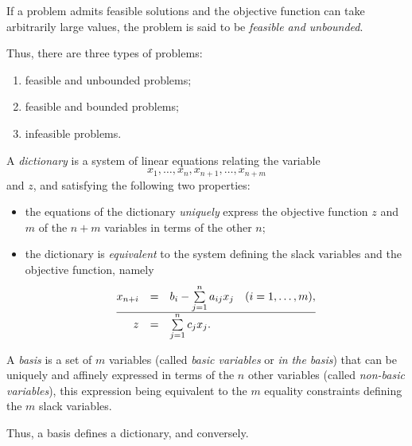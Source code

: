 \begin{definition}
    If a problem admits feasible solutions and the objective function can take arbitrarily large values, the problem is said to be \emph{feasible and unbounded}.
\end{definition}

\begin{remark}
    Thus, there are three types of problems:
    \begin{enumerate}
        \item feasible and unbounded problems;
        \item feasible and bounded problems;
        \item infeasible problems.
    \end{enumerate}
\end{remark}

\begin{definition}
    A \emph{dictionary} is a system of linear equations relating the variable
    \[
        x_1,\dots,x_n,x_{n+1},\dots,x_{n+m}
    \]
    and $z$, and satisfying the following two properties:
    \begin{itemize}
        \item the equations of the dictionary \emph{uniquely} express the objective function $z$ and $m$ of the $n+m$ variables in terms of the other $n$;
        \item the dictionary is \emph{equivalent} to the system defining the slack variables and the objective function, namely
    \[
        \begin{array}{@{}rcl@{}}   
        x_{n+i} &=&b_i - \sum\limits_{j=1}^n a_{ij}x_j \quad (i=1,\dots,m),\\
        \hline z &=& \sum\limits_{j=1}^n c_j x_j .
        \end{array}
    \]
    \end{itemize}
\end{definition}

\begin{definition}[Basis]\label{def:base}
    A \emph{basis} is a set of $m$ variables (called \emph{basic variables} or \emph{in the basis}) that can be uniquely and affinely expressed in terms of the $n$ other variables (called \emph{non-basic variables}), this expression being equivalent to the $m$ equality constraints defining the $m$ slack variables.
\end{definition}

\begin{remark}
    Thus, a basis defines a dictionary, and conversely.
\end{remark}

